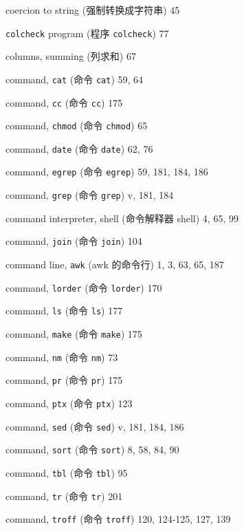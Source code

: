 \begin{multicols}{2}
\hangindent=2pc  coercion to string (强制转换成字符串) 45

\hangindent=2pc  \verb'colcheck' program (程序 \verb'colcheck') 77

\hangindent=2pc  columns, summing (列求和) 67

\hangindent=2pc  command, \verb'cat' (命令 \verb'cat') 59, 64

\hangindent=2pc  command, \verb'cc' (命令 \verb'cc') 175

\hangindent=2pc  command, \verb'chmod' (命令 \verb'chmod') 65

\hangindent=2pc  command, \verb'date' (命令 \verb'date') 62, 76

\hangindent=2pc  command, \verb'egrep' (命令 \verb'egrep')
59, 181, 184,  186

\hangindent=2pc  command, \verb'grep' (命令 \verb'grep') v, 181, 184

\hangindent=2pc  command interpreter, shell (命令解释器 shell)
4, 65,  99

\hangindent=2pc  command, \verb'join' (命令 \verb'join') 104

\hangindent=2pc  command line, \verb'awk' (awk 的命令行) 1, 3, 63, 65, 187

\hangindent=2pc  command, \verb'lorder' (命令 \verb'lorder') 170

\hangindent=2pc  command, \verb'ls' (命令 \verb'ls') 177

\hangindent=2pc  command, \verb'make' (命令 \verb'make') 175

\hangindent=2pc  command, \verb'nm' (命令 \verb'nm') 73

\hangindent=2pc  command, \verb'pr' (命令 \verb'pr') 175

\hangindent=2pc  command, \verb'ptx' (命令 \verb'ptx') 123

\hangindent=2pc  command, \verb'sed' (命令 \verb'sed') 
v, 181, 184, 186

\hangindent=2pc  command, \verb'sort' (命令 \verb'sort') 8, 58, 84, 90

\hangindent=2pc  command, \verb'tbl' (命令 \verb'tbl') 95

\hangindent=2pc  command, \verb'tr' (命令 \verb'tr') 201

\hangindent=2pc  command, \verb'troff' (命令 \verb'troff')
120, 124-125, 127, 139


\end{multicols}
